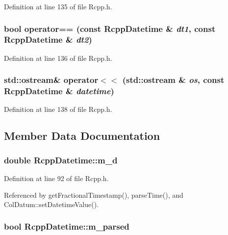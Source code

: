 Definition at line 135 of file Rcpp.h.\hypertarget{classRcppDatetime_c6643666732e0a62c501da9f0ae9e342}{
\subsubsection[operator==]{\setlength{\rightskip}{0pt plus 5cm}bool operator== (const {\bf RcppDatetime} \& {\em dt1}, \/  const {\bf RcppDatetime} \& {\em dt2})}}
\label{classRcppDatetime_c6643666732e0a62c501da9f0ae9e342}




Definition at line 136 of file Rcpp.h.\hypertarget{classRcppDatetime_778b21a52b7f2b17978933c3ec27754e}{
\subsubsection[operator$<$$<$]{\setlength{\rightskip}{0pt plus 5cm}std::ostream\& operator$<$$<$ (std::ostream \& {\em os}, \/  const {\bf RcppDatetime} \& {\em datetime})}}
\label{classRcppDatetime_778b21a52b7f2b17978933c3ec27754e}




Definition at line 138 of file Rcpp.h.

\subsection{Member Data Documentation}
\hypertarget{classRcppDatetime_1af187ff381bfa0f5b57d28b64d7b60c}{
\subsubsection[m\_\-d]{\setlength{\rightskip}{0pt plus 5cm}double {\bf RcppDatetime::m\_\-d}}}
\label{classRcppDatetime_1af187ff381bfa0f5b57d28b64d7b60c}




Definition at line 92 of file Rcpp.h.

Referenced by getFractionalTimestamp(), parseTime(), and ColDatum::setDatetimeValue().\hypertarget{classRcppDatetime_515e3390c1834e58ce6bba39854638ad}{
\subsubsection[m\_\-parsed]{\setlength{\rightskip}{0pt plus 5cm}bool {\bf RcppDatetime::m\_\-parsed}}}
\label{classRcppDatetime_515e3390c1834e58ce6bba39854638ad}




